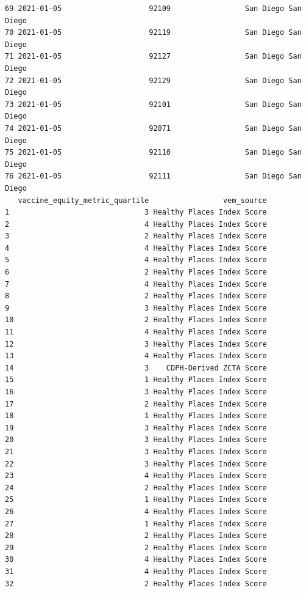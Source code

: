 \documentclass[
  letterpaper,
  DIV=11,
  numbers=noendperiod]{scrartcl}
\begin{document}
\begin{verbatim}
69 2021-01-05                    92109                 San Diego San Diego
70 2021-01-05                    92119                 San Diego San Diego
71 2021-01-05                    92127                 San Diego San Diego
72 2021-01-05                    92129                 San Diego San Diego
73 2021-01-05                    92101                 San Diego San Diego
74 2021-01-05                    92071                 San Diego San Diego
75 2021-01-05                    92110                 San Diego San Diego
76 2021-01-05                    92111                 San Diego San Diego
   vaccine_equity_metric_quartile                 vem_source
1                               3 Healthy Places Index Score
2                               4 Healthy Places Index Score
3                               2 Healthy Places Index Score
4                               4 Healthy Places Index Score
5                               4 Healthy Places Index Score
6                               2 Healthy Places Index Score
7                               4 Healthy Places Index Score
8                               2 Healthy Places Index Score
9                               3 Healthy Places Index Score
10                              2 Healthy Places Index Score
11                              4 Healthy Places Index Score
12                              3 Healthy Places Index Score
13                              4 Healthy Places Index Score
14                              3    CDPH-Derived ZCTA Score
15                              1 Healthy Places Index Score
16                              3 Healthy Places Index Score
17                              2 Healthy Places Index Score
18                              1 Healthy Places Index Score
19                              3 Healthy Places Index Score
20                              3 Healthy Places Index Score
21                              3 Healthy Places Index Score
22                              3 Healthy Places Index Score
23                              4 Healthy Places Index Score
24                              2 Healthy Places Index Score
25                              1 Healthy Places Index Score
26                              4 Healthy Places Index Score
27                              1 Healthy Places Index Score
28                              2 Healthy Places Index Score
29                              2 Healthy Places Index Score
30                              4 Healthy Places Index Score
31                              4 Healthy Places Index Score
32                              2 Healthy Places Index Score

\end{verbatim}
\end{document}
